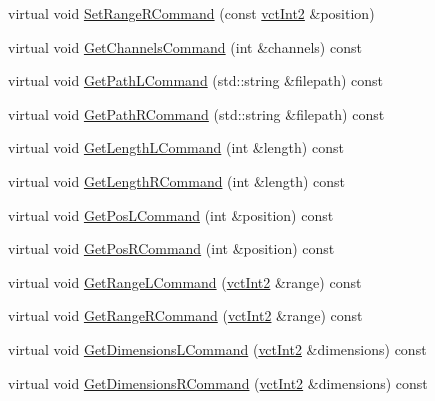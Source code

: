 \begin{DoxyCompactItemize}
\item 
virtual void \hyperlink{classsvl_filter_source_video_file_ac78b9b12bb31557020c34822248b8231}{Set\+Range\+R\+Command} (const \hyperlink{vct_fixed_size_vector_types_8h_add8c88eb6a432b15f14b866b9c35325f}{vct\+Int2} \&position)
\item 
virtual void \hyperlink{classsvl_filter_source_video_file_ac833baec6619f2483f66e057268b2b22}{Get\+Channels\+Command} (int \&channels) const 
\item 
virtual void \hyperlink{classsvl_filter_source_video_file_ae09a83350d176eb26a323af301d13576}{Get\+Path\+L\+Command} (std\+::string \&filepath) const 
\item 
virtual void \hyperlink{classsvl_filter_source_video_file_ad6cd961bd423947df2392c88b651c23f}{Get\+Path\+R\+Command} (std\+::string \&filepath) const 
\item 
virtual void \hyperlink{classsvl_filter_source_video_file_a83c39385856f80b777014b3667d475c3}{Get\+Length\+L\+Command} (int \&length) const 
\item 
virtual void \hyperlink{classsvl_filter_source_video_file_afe2a9891303d688e681a288938865095}{Get\+Length\+R\+Command} (int \&length) const 
\item 
virtual void \hyperlink{classsvl_filter_source_video_file_a8d2661ac0ebddbe82c7f9c10eba02c0d}{Get\+Pos\+L\+Command} (int \&position) const 
\item 
virtual void \hyperlink{classsvl_filter_source_video_file_a5377a376d1598177cb8d4b6d6e5f7120}{Get\+Pos\+R\+Command} (int \&position) const 
\item 
virtual void \hyperlink{classsvl_filter_source_video_file_ad7727bb1fd9f37de5aceb1c7ad6a3f06}{Get\+Range\+L\+Command} (\hyperlink{vct_fixed_size_vector_types_8h_add8c88eb6a432b15f14b866b9c35325f}{vct\+Int2} \&range) const 
\item 
virtual void \hyperlink{classsvl_filter_source_video_file_ae6fb6ee337099293a4aa1286a8a86bba}{Get\+Range\+R\+Command} (\hyperlink{vct_fixed_size_vector_types_8h_add8c88eb6a432b15f14b866b9c35325f}{vct\+Int2} \&range) const 
\item 
virtual void \hyperlink{classsvl_filter_source_video_file_ab852fecc3903aeebf419c2bc7a57319b}{Get\+Dimensions\+L\+Command} (\hyperlink{vct_fixed_size_vector_types_8h_add8c88eb6a432b15f14b866b9c35325f}{vct\+Int2} \&dimensions) const 
\item 
virtual void \hyperlink{classsvl_filter_source_video_file_ae7ac2fdf4049ffd6e7a1d34a38fbab4d}{Get\+Dimensions\+R\+Command} (\hyperlink{vct_fixed_size_vector_types_8h_add8c88eb6a432b15f14b866b9c35325f}{vct\+Int2} \&dimensions) const 

\end{DoxyCompactItemize}
